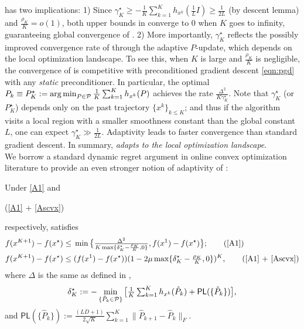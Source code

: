  has two implications: 
1) Since $\gamma_K^\star \geq - \frac{1}{K}\sum_{k = 1}^K  h_{x^k} (\frac{1}{L}I) \geq \frac{1}{2L}$ (by descent lemma) and $\tfrac{\rho_K}{K} = o(1)$, both upper bounds in  converge to $0$ when $K$ goes to infinity, guaranteeing global convergence of {\hdm}.
2) More importantly, $\gamma_K^\star$ reflects the possibly improved convergence rate of {\hdm} through the adaptive $P$-update, which depends on the local optimization landscape.
To see this, when $K$ is large and $\tfrac{\rho_K}{K}$ is negligible, the convergence of {\hdm} is competitive with preconditioned gradient descent \eqref{eqn:pgd} with any \emph{static} preconditioner. In particular, the optimal $P_k \equiv P_K^{\star} \assign \argmin_{P \in \mathcal{P}}  \tfrac{1}{K} \textstyle\sum_{k = 1}^K h_{x^k}(P)$ achieves the rate $\tfrac{\Delta^2}{K \gamma_K^\star}$.
Note that $\gamma_K^\star$ (or $P_K^\star$) depends only on the past trajectory $\{x^k\}_{k \leq K}$; and thus if the algorithm visits a local region with a smaller smoothness constant than the global constant $L$, one can expect $\gamma_K^\star \gg \frac{1}{2L}$. Adaptivity leads to faster convergence than standard gradient descent.
In summary, {\hdm} \emph{adapts to the local optimization landscape}.\\

We borrow a standard dynamic regret argument in online convex optimization literature \cite{hazan2016introduction} to provide an even stronger notion of adaptivity of {\hdm}:
\begin{thm}\label{thm:dynamic-adaptivity}
Under \ref{A1} and \begin{rm}{(\ref{A1} + \ref{Ascvx})}\end{rm} respectively,  satisfies
\begin{align}
f (x^{K + 1}) - f (x^{\star}) & \leq{} \min \big\{ \tfrac{\Delta^2}{K \max\{ \delta_K^{\star} - \frac{\rho_K}{K}, 0 \} }, f (x^1) - f (x^{\star}) \big\}; \tag{\ref{A1}} \\
f (x^{K + 1}) - f (x^{\star}) & \leq{} (f (x^1) - f (x^{\star})) ( 1 - 2 \mu \max\{ \delta_K^{\star} - \tfrac{\rho_K}{K}, 0 \} )^K, \tag{\ref{A1} + \ref{Ascvx}}
\end{align}
where $\Delta$ is the same as defined in ,
\begin{align}\label{eqn:dynamic-regret}
\delta_K^{\star} := -\min_{\{\hat{P}_k \in \mathcal{P}\}}  \big[ \tfrac{1}{K} \textstyle\sum_{k = 1}^K h_{x^k} (\hat{P}_k) + \mathsf{PL}(\{\hat{P}_k\}) \big], 
\end{align}
and $\mathsf{PL}(\{\hat{P}_k\}):=\tfrac{(L D + 1)}{2 \sqrt{K}} \textstyle\sum_{k = 1}^K \| \hat{P}_{k + 1} - \hat{P}_k \|_F$.
\end{thm}

